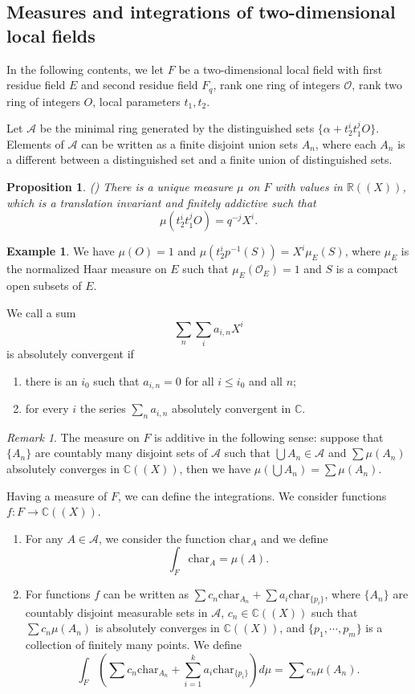 \documentclass{amsart}
\newtheorem{proposition}[theorem]{Proposition}
\theoremstyle{definition}
\newtheorem{example}[theorem]{Example}
\theoremstyle{remark}
\newtheorem{remark}[theorem]{Remark}
\numberwithin{equation}{section}
\def  \Char     {\mathrm{char}}
\def  \ca       {\mathcal{A}}
\def  \co       {\mathcal{O}}
\def  \bc       {\mathbb{C}}
\begin{document}
\subsection{Measures   and  integrations  of two-dimensional local fields}
In the following contents,  we  let  $F$ be a two-dimensional local field with first residue field $E$ and second residue field $F_q$, rank one ring of  integers $\co$, rank two ring of integers $O$,  local parameters  $t_1, t_2$.

Let $\ca$ be the minimal ring generated by the distinguished sets $\{ \alpha+ t_2^it_1^jO  \}$.  Elements of $\ca$ can be written as a finite disjoint union sets $A_n$,  where each $A_n$ is a different between a distinguished set and a finite union of distinguished sets.                                                                          
\begin{proposition}    \textnormal{(\cite{fesenko2003analysis})}
	There is a unique measure  $\mu$ on $F$  with values in $\mathbb{R}((X))$,  which is a translation invariant  and finitely addictive  such that
	$$
	\mu ( t_2^i   t_1 ^j  O)  = q^{-j} X^i.
	$$
\end{proposition}
\begin{example}
We have $\mu(O)=1$ and $\mu(t_2^i p^{-1} (S)) =X^i \mu_E(S)$,  where $\mu_E$ is the normalized Haar measure on $E$  such that $\mu_E(\co_{E})=1$ and $S$ is a compact open subsets of $E$.
\end{example}

We call a sum 
$$
\underset{n}{\sum} \underset{i}{\sum} a_{i,n} X^i
$$
is absolutely convergent  if
\begin{enumerate}
	\item  there is  an $i_0$ such that $a_{i,n} =0$ for all $ i\leq i_0$ and all $n$;
	\item  for every $i$ the series $\sum_{n} a_{i,n}$ absolutely convergent in $\bc$. 
\end{enumerate}

\begin{remark}
	The measure on $F$ is additive in the following sense: suppose that $\{A_n\}$ are countably many disjoint sets of $\ca$ such that $\bigcup A_n  \in \ca$ and $\sum \mu(A_n) $ absolutely converges in $\bc((X))$, then we have $\mu(\bigcup A_n)= \sum \mu(A_n)$.
\end{remark}
Having a measure of $F$, we can define the integrations.   We consider functions $f: F \to \bc((X))$.
\begin{enumerate}
	\item  For any $A \in \ca$, we  consider the  function $\mathrm{char}_{A}$ and we define
	$$
	\int_F   \Char_{A}  = \mu(A).
	$$
	\item  For functions $f$ can be written as $\sum c_n\Char_ {A_n}  +   \sum  a_i  \Char_{\{p_i\}}$, where  $\{A_n \}$ are countably disjoint measurable sets in $\ca$, $c_n \in \bc((X))$ such that $\sum c_n \mu(A_n)$ is absolutely converges in $\bc((X))$, and $\{p_1, \cdots, p_m\}$ is  a collection of  finitely many points. We define
	$$
	\int_F ( \sum c_n\Char_ {A_n}  +   \sum_{i=1}^{k}  a_i  \Char_{\{p_i\}}  ) d \mu = \sum c_n \mu(A_n).
	$$
\end{enumerate}
\end{document}

